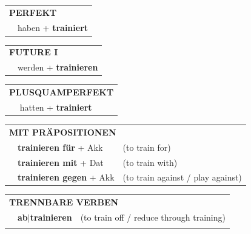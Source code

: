 \documentclass[10pt,a4paper]{revtex4-2}
\begin{document}
\begin{verbbox}
 \vspace{10pt}

 \begin{tabular}{rl}
     \multicolumn{2}{l}{\textbf{PERFEKT}}\\
   & haben + \textbf{trainiert}\\
  \end{tabular}
\hfill
   \begin{tabular}{rl}
    \multicolumn{2}{l}{\textbf{FUTURE I}}\\
   & werden + \textbf{trainieren}\\
  \end{tabular}
\hfill
   \begin{tabular}{rl}
      \multicolumn{2}{l}{\textbf{PLUSQUAMPERFEKT}}\\
   & hatten + \textbf{trainiert}\\
  \end{tabular}

   \vspace{10pt}

   \begin{tabular}{lll}
      \multicolumn{3}{l}{\textbf{MIT PRÄPOSITIONEN}}\\
& \textbf{trainieren für} + Akk & (to train for)\\
& \textbf{trainieren mit} + Dat & (to train with)\\
& \textbf{trainieren gegen} + Akk & (to train against / play against)\\
\end{tabular}
  \hfill
   \begin{tabular}{lll}
      \multicolumn{3}{l}{\textbf{TRENNBARE VERBEN}}\\
 & \textbf{ab$|$trainieren} & (to train off / reduce through training)\\
\vspace{20pt}
  \end{tabular}
  \vspace{-5pt}
\end{verbbox}
\end{document}
